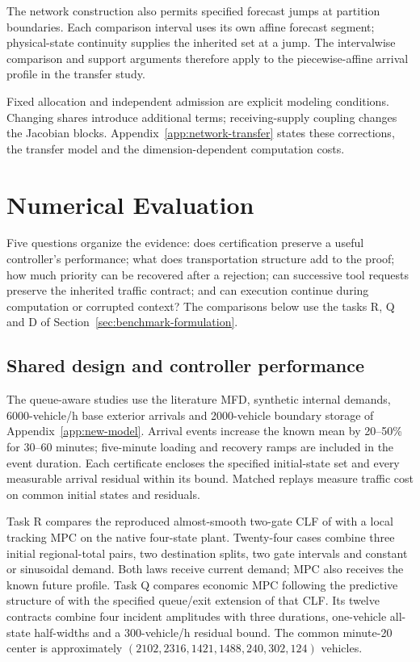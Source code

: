 \documentclass[journal,10pt]{IEEEtran}
\newcommand{\appref}[1]{Appendix~\ref{#1}}
\begin{document}
The network construction also permits specified forecast jumps at partition
boundaries. Each comparison interval uses its own affine forecast segment;
physical-state continuity supplies the inherited set at a jump. The
intervalwise comparison and support arguments therefore apply to the
piecewise-affine arrival profile in the transfer study.

Fixed allocation and independent admission are explicit modeling conditions.
Changing shares introduce additional terms; receiving-supply coupling changes
the Jacobian blocks. \appref{app:network-transfer} states these corrections,
the transfer model and the dimension-dependent computation costs.



\section{Numerical Evaluation}
\label{sec:new-evidence}

Five questions organize the evidence: does certification preserve a useful
controller's performance; what does transportation structure add to the proof;
how much priority can be recovered after a rejection; can successive tool
requests preserve the inherited traffic contract; and can execution continue
during computation or corrupted context? The comparisons below use the tasks
R, Q and D of Section~\ref{sec:benchmark-formulation}.

\subsection{Shared design and controller performance}
\label{sec:new-incident-protocol}
\label{sec:controller-benchmarks}

The queue-aware studies use the literature MFD, synthetic internal demands,
6000-vehicle/h base exterior arrivals and 2000-vehicle boundary storage of
\appref{app:new-model}. Arrival events increase the known mean by 20--50\%
for 30--60 minutes; five-minute loading and recovery ramps are included in
the event duration. Each certificate encloses the specified initial-state
set and every measurable arrival residual within its bound. Matched replays
measure traffic cost on common initial states and residuals.

Task R compares the reproduced almost-smooth two-gate CLF of
\cite{zhong2018robust} with a local tracking MPC on the native four-state
plant. Twenty-four cases combine three initial regional-total pairs, two
destination splits, two gate intervals and constant or sinusoidal demand.
Both laws receive current demand; MPC also receives the known future profile.
Task Q compares economic MPC following the predictive structure of
\cite{geroliminis2013mpc} with the specified queue/exit extension of that CLF.
Its twelve contracts combine four incident amplitudes with three durations,
one-vehicle all-state half-widths and a 300-vehicle/h residual bound.
The common minute-20 center is approximately
$(2102,2316,1421,1488,240,302,124)$ vehicles.
\end{document}
